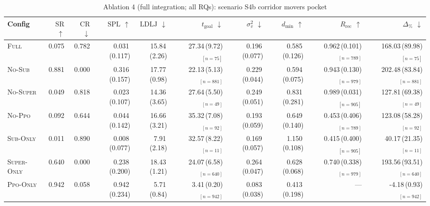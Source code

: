 \begin{table}[h]
\centering
\small
\caption{Ablation 4 (full integration; all RQs): scenario S4b corridor movers pocket}
\label{tab:abl4:S4b_corridor_movers_pocket}
\begin{tabular}{lrrrrrrrrr}
\toprule
Config & $\mathrm{SR}$ $\uparrow$ & $\mathrm{CR}$ $\downarrow$ & $\mathrm{SPL}$ $\uparrow$ & $\mathrm{LDLJ}$ $\downarrow$ & $t_{\mathrm{goal}}$ $\downarrow$ & $\sigma^2_v$ $\downarrow$ & $d_{\min}$ $\uparrow$ & $R_{\mathrm{rec}}$ $\uparrow$ & $\Delta_{\%}$ $\downarrow$ \\
\midrule
\textsc{Full} & 0.075 & 0.782 & 0.031\,(0.117) & 15.84\,(2.26) & 27.34\,(9.72)$_{[n=75]}$ & 0.196\,(0.077) & 0.585\,(0.126) & 0.962\,(0.101)$_{[n=789]}$ & 168.03\,(89.98)$_{[n=75]}$ \\
\textsc{No-Sub} & 0.881 & 0.000 & 0.316\,(0.157) & 17.77\,(0.98) & 22.13\,(5.13)$_{[n=881]}$ & 0.229\,(0.044) & 0.594\,(0.075) & 0.943\,(0.130)$_{[n=979]}$ & 202.48\,(83.84)$_{[n=881]}$ \\
\textsc{No-Super} & 0.049 & 0.818 & 0.023\,(0.107) & 14.36\,(3.65) & 27.64\,(5.50)$_{[n=49]}$ & 0.249\,(0.051) & 0.831\,(0.281) & 0.989\,(0.031)$_{[n=905]}$ & 127.81\,(69.38)$_{[n=49]}$ \\
\textsc{No-Ppo} & 0.092 & 0.644 & 0.044\,(0.142) & 16.66\,(3.21) & 35.32\,(7.08)$_{[n=92]}$ & 0.193\,(0.059) & 0.649\,(0.140) & 0.453\,(0.406)$_{[n=789]}$ & 123.08\,(58.28)$_{[n=92]}$ \\
\textsc{Sub-Only} & 0.011 & 0.890 & 0.008\,(0.077) & 7.91\,(2.18) & 32.57\,(8.22)$_{[n=11]}$ & 0.169\,(0.057) & 1.150\,(0.108) & 0.415\,(0.400)$_{[n=905]}$ & 40.17\,(21.35)$_{[n=11]}$ \\
\textsc{Super-Only} & 0.640 & 0.000 & 0.238\,(0.200) & 18.43\,(1.21) & 24.07\,(6.58)$_{[n=640]}$ & 0.264\,(0.047) & 0.628\,(0.068) & 0.740\,(0.338)$_{[n=979]}$ & 193.56\,(93.51)$_{[n=640]}$ \\
\textsc{Ppo-Only} & 0.942 & 0.058 & 0.942\,(0.234) & 5.71\,(0.84) & 3.41\,(0.20)$_{[n=942]}$ & 0.083\,(0.038) & 0.413\,(0.198) & --- & -4.18\,(0.93)$_{[n=942]}$ \\
\bottomrule
\end{tabular}
\end{table}